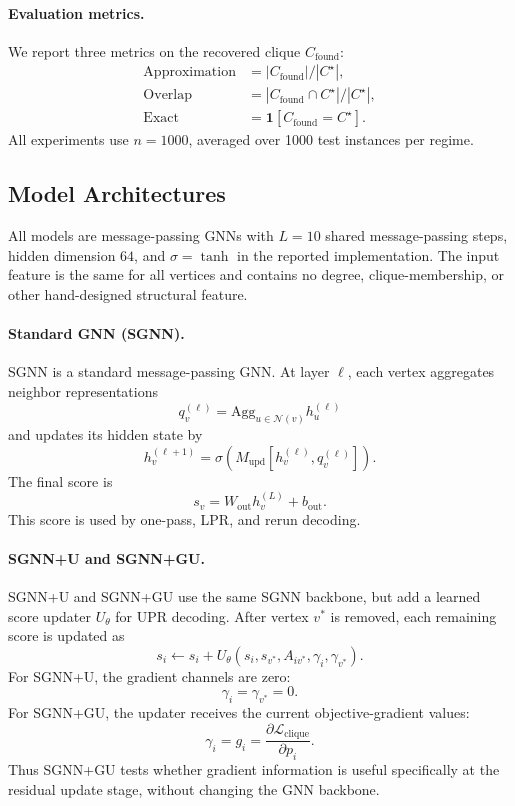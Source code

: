 \documentclass[11pt]{article}
\theoremstyle{plain}
\theoremstyle{definition}
\theoremstyle{remark}
\begin{document}
\paragraph{Evaluation metrics.}
We report three metrics on the recovered clique $C_{\text{found}}$:
\begin{align*}
  \text{Approximation} &= |C_{\text{found}}| / |C^\star|, \\
  \text{Overlap}       &= |C_{\text{found}} \cap C^\star| / |C^\star|, \\
  \text{Exact}         &= \mathbf{1}[C_{\text{found}} = C^\star].
\end{align*}
All experiments use $n = 1000$, averaged over 1000 test instances per regime.

\subsection{Model Architectures}
\label{sec:architectures}

All models are message-passing GNNs with $L=10$ shared message-passing steps, hidden
dimension $64$, and $\sigma=\tanh$ in the reported implementation. The input feature
is the same for all vertices and contains no degree, clique-membership, or other
hand-designed structural feature.

\paragraph{Standard GNN (SGNN).}
SGNN is a standard message-passing GNN. At layer $\ell$, each vertex aggregates
neighbor representations
\[
  q_v^{(\ell)}
  =
  \mathrm{Agg}_{u\in\mathcal{N}(v)} h_u^{(\ell)}
\]
and updates its hidden state by
\[
  h_v^{(\ell+1)}
  =
  \sigma\!\left(
    M_{\mathrm{upd}}\!\left[
      h_v^{(\ell)},q_v^{(\ell)}
    \right]
  \right).
\]
The final score is
\[
  s_v = W_{\mathrm{out}} h_v^{(L)} + b_{\mathrm{out}} .
\]
This score is used by one-pass, LPR, and rerun decoding.

\paragraph{SGNN+U and SGNN+GU.}
SGNN+U and SGNN+GU use the same SGNN backbone, but add a learned score updater
$U_\theta$ for UPR decoding. After vertex $v^*$ is removed, each remaining score is
updated as
\[
  s_i
  \leftarrow
  s_i
  +
  U_\theta(s_i,s_{v^*},A_{iv^*},\gamma_i,\gamma_{v^*}) .
\]
For SGNN+U, the gradient channels are zero:
\[
  \gamma_i=\gamma_{v^*}=0.
\]
For SGNN+GU, the updater receives the current objective-gradient values:
\[
  \gamma_i =
  g_i
  =
  \frac{\partial \mathcal{L}_{\mathrm{clique}}}{\partial p_i}.
\]
Thus SGNN+GU tests whether gradient information is useful specifically at the
residual update stage, without changing the GNN backbone.
\end{document}

